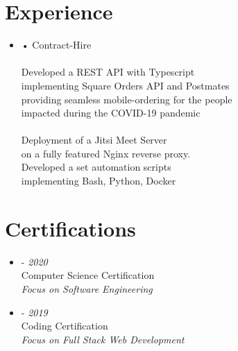 \documentclass[11pt,oneside,a4paper,titlepage]{article}
\begin{document}
\begin{tcolorbox}
\begin{minipage}[t]{10cm}
\begin{tcolorbox}[grow to right by=1cm,colframe=white,colback=white]
      \section*{Experience}
      \vspace{-0.2cm}
      \begin{itemize}
        \item{
            {{} • Contract-Hire}
            \vspace{0.2cm}\\
            \emph{}\\
            {Developed a {{REST API}} with {{Typescript}}}\\
            {implementing {{Square Orders API}} and {{Postmates}}}\\
            {providing seamless mobile-ordering for the people}\\
            {impacted during the COVID-19 pandemic}
            \vspace{0.2cm}\\
            \emph{}\\
            {Deployment of a {Jitsi Meet} Server}\\
            {on a fully featured {Nginx} reverse proxy}.\\
            {Developed a set automation scripts}\\
            {implementing {Bash}, {Python}, {Docker}}

        }
      \end{itemize}

      \vspace{-0.6cm}
      \section*{Certifications}
      \vspace{-0.2cm}
      \begin{itemize}[]
        \item{
            {{} - \footnotesize{\emph{2020}}}\\
            Computer Science Certification\\
            \emph{Focus on Software Engineering}
          }
        \item{
            {{} - \footnotesize{\emph{2019}}}\\
            {Coding Certification}\\
            \emph{Focus on Full Stack Web Development}
          }
      \end{itemize}


\end{tcolorbox}
\end{minipage}
\end{tcolorbox}
\end{document}
